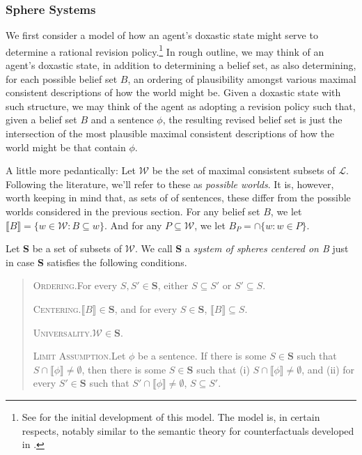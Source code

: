 \subsubsection{Sphere Systems}\label{caie-section2-3-1}

We first consider a model of how an agent's doxastic state might serve to determine a rational revision policy.\footnote{See \citet{Grove1} for the initial development of this model. The model is, in certain respects, notably similar to the semantic theory for counterfactuals developed in \citet{Lewis1}.}
In rough outline, we may think of an agent's doxastic state, in addition to determining a belief set, as also determining, for each possible belief set $B$, an ordering of plausibility amongst various maximal consistent descriptions of how the world might be.
Given a doxastic state with such structure, we may think of the agent as adopting a revision policy such that, given a belief set $B$ and a sentence $\phi$, the resulting revised belief set is just the intersection of the most plausible maximal consistent descriptions of how the world might be that contain $\phi$.

A little more pedantically: Let $\mathcal{W}$ be the set of maximal consistent subsets of $\mathcal{L}$.
Following the literature, we'll refer to these as \textit{possible worlds}.
It is, however, worth keeping in mind that, as sets of of sentences, these differ from the possible worlds considered in the previous section.
For any belief set $B$, we let $\llbracket B \rrbracket = \{w \in \mathcal{W}: B \subseteq w \}$.
And for any $P \subseteq \mathcal{W}$, we let $B_P = \cap \{w: w \in P \}$.

Let \textbf{S} be a set of subsets of $\mathcal{W}$.
We call \textbf{S} a \textit{system of spheres centered on B} just in case \textbf{S} satisfies the following conditions.
\begin{quote}
\textsc{Ordering.}\quad For every $S, S' \in \textbf{S}$, either $S \subseteq S'$ or $S' \subseteq S$.

\textsc{Centering.}\quad $\llbracket B \rrbracket \in \textbf{S}$, and for every $S \in \textbf{S}$, $\llbracket B \rrbracket \subseteq S$.

\textsc{Universality.}\quad $\mathcal{W} \in \textbf{S}$.

\textsc{Limit Assumption.}\quad Let $\phi$ be a sentence. If there is some $S \in \textbf{S}$ such that $S \cap \llbracket \phi \rrbracket \neq \emptyset$, then there is some $S \in \textbf{S}$ such that (i) $S \cap \llbracket \phi \rrbracket \neq \emptyset$, and  (ii) for every $S' \in \textbf{S}$ such that $S' \cap \llbracket \phi \rrbracket \neq \emptyset$, $S \subseteq S'$.
\end{quote}

